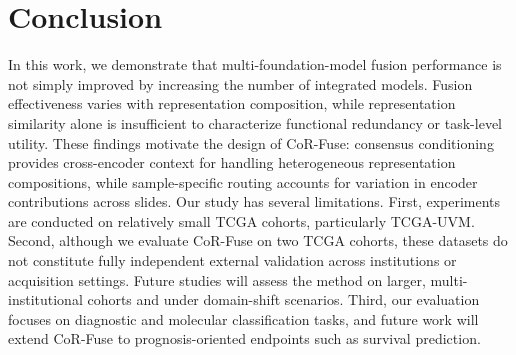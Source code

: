 \section{Conclusion}
In this work, we demonstrate that multi-foundation-model fusion performance is not simply improved by increasing the number of integrated models. 
Fusion effectiveness varies with representation composition, while representation similarity alone is insufficient to characterize functional redundancy or task-level utility. 
These findings motivate the design of CoR-Fuse: consensus conditioning provides cross-encoder context for handling heterogeneous representation compositions, while sample-specific routing accounts for variation in encoder contributions across slides.
Our study has several limitations.
First, experiments are conducted on relatively small TCGA cohorts, particularly TCGA-UVM. 
Second, although we evaluate CoR-Fuse on two TCGA cohorts, these datasets do not constitute fully independent external validation across institutions or acquisition settings. 
Future studies will assess the method on larger, multi-institutional cohorts and under domain-shift scenarios.
Third, our evaluation focuses on diagnostic and molecular classification tasks, and future work will extend CoR-Fuse to prognosis-oriented endpoints such as survival prediction.